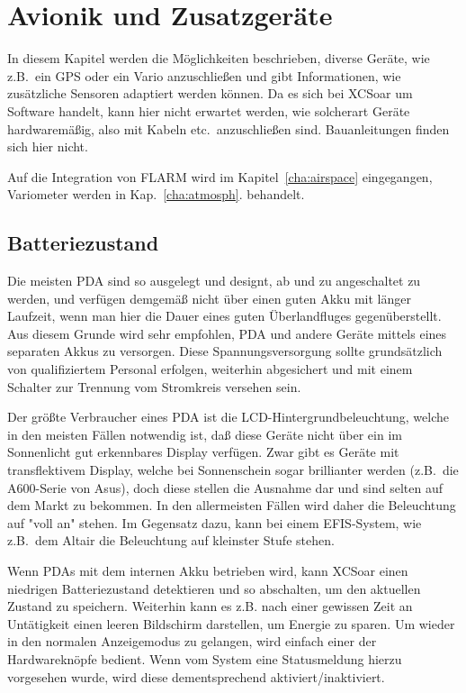 \chapter{Avionik und Zusatzgeräte}\label{cha:avionics-airframe}

In diesem Kapitel werden  die Möglichkeiten beschrieben,  diverse Geräte, wie z.B.\ ein GPS oder ein Vario anzuschließen und gibt Informationen, wie zusätzliche Sensoren adaptiert werden können.
\warning  Da es sich bei \textsf{XCSoar} um Software handelt, kann hier nicht erwartet werden, wie solcherart Geräte hardwaremäßig, also mit Kabeln etc.\ anzuschließen sind. Bauanleitungen finden sich hier nicht.

Auf die Integration von FLARM wird im Kapitel~\ref{cha:airspace}  eingegangen, Variometer werden in Kap.~\ref{cha:atmosph}.   behandelt.

\section{Batteriezustand}

Die meisten \textsf{PDA} sind so ausgelegt und designt, ab und zu angeschaltet zu werden, und verfügen demgemäß nicht über einen guten Akku mit länger Laufzeit, wenn man hier die Dauer eines guten Überlandfluges gegenüberstellt. Aus diesem Grunde wird sehr empfohlen, \textsf{PDA} und andere Geräte mittels eines separaten Akkus zu versorgen. Diese Spannungsversorgung sollte grundsätzlich von qualifiziertem Personal erfolgen, weiterhin abgesichert und mit einem Schalter zur  Trennung vom Stromkreis versehen sein.

Der größte Verbraucher eines \textsf{PDA} ist die LCD-Hintergrundbeleuchtung, welche in den meisten Fällen notwendig ist, daß diese Geräte nicht über ein im Sonnenlicht gut erkennbares Display verfügen. Zwar gibt es Geräte mit transflektivem Display, welche bei Sonnenschein sogar brillianter werden (z.B.\ die A600-Serie von Asus), doch diese stellen die Ausnahme dar und sind selten auf dem Markt zu bekommen.  In den allermeisten Fällen wird daher die Beleuchtung auf "voll an" stehen. Im Gegensatz dazu, kann bei einem EFIS-System, wie z.B.\ dem \textsf{Altair} die Beleuchtung auf kleinster Stufe stehen.


Wenn \textsf{PDA}s mit dem internen Akku betrieben wird, kann  \textsf{XCSoar} einen niedrigen Batteriezustand detektieren und so abschalten, um den aktuellen Zustand zu speichern. Weiterhin kann es z.B. nach einer gewissen Zeit an Untätigkeit einen leeren Bildschirm  darstellen, um Energie zu sparen.   Um wieder in den normalen Anzeigemodus zu gelangen, wird einfach einer der Hardwareknöpfe bedient. Wenn vom System eine Statusmeldung hierzu vorgesehen wurde, wird diese dementsprechend aktiviert/inaktiviert.

